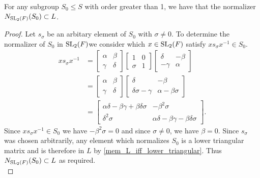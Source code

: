 \begin{proposition}
\label{normalizer_subgroup_S_le_L}
\leanok
 For any subgroup $S_0 \leq S$ with order greater than 1, we have that the normalizer $N_{\operatorname{SL}_2(F)}(S_0) \subset L$.
\end{proposition}
\begin{proof}
    \leanok
Let $s_\sigma$ be an arbitary element of $S_0$ with $\sigma \neq 0$. To determine the normalizer of $S_0$ in $\operatorname{SL}_2(F)$we consider which $x \in \operatorname{SL}_2(F)$ satisfy $x s_\sigma x^{-1} \in S_0$.
\begin{align*} x s_\sigma x^{-1} &= \begin{bmatrix} \alpha & \beta \\ \gamma & \delta \end{bmatrix} \begin{bmatrix} 1 & 0 \\ \sigma & 1 \end{bmatrix} \begin{bmatrix} \delta & - \beta \\ - \gamma & \alpha \end{bmatrix}
\\[1.5ex] &= \begin{bmatrix} \alpha & \beta \\ \gamma & \delta \end{bmatrix} \begin{bmatrix} \delta & - \beta \\ \delta \sigma - \gamma & \alpha - \beta \sigma \end{bmatrix}
\\[1.5ex] &= \begin{bmatrix} \alpha \delta - \beta \gamma + \beta \delta \sigma & - \beta^2  \sigma \\ \delta^2 \sigma & \alpha \delta - \beta \gamma - \beta \delta \sigma \end{bmatrix}.
\end{align*}
Since $x s_\sigma x^{-1} \in S_0$ we have $- \beta^2  \sigma = 0$ and since $\sigma \neq 0$, we have $\beta = 0$. Since $s_\sigma$ was chosen arbitrarily, 
any element which normalizes $S_0$ is a lower triangular matrix and is therefore in $L$ by \ref{mem_L_iff_lower_triangular}. Thus $N_{\operatorname{SL}_2(F)}(S_0) \subset L$ as required. \\
\end{proof}



